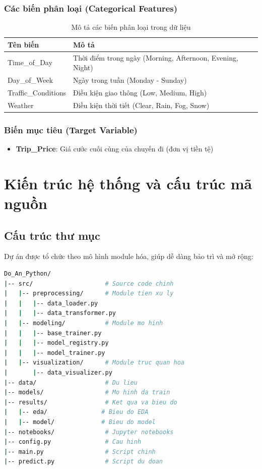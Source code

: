 \documentclass[12pt,a4paper]{article}
\begin{document}
\subsubsection{Các biến phân loại (Categorical Features)}

\begin{table}[H]
\centering
\caption{Mô tả các biến phân loại trong dữ liệu}
\label{tab:categorical_features}
\begin{tabular}{|l|p{8cm}|}
\hline
\textbf{Tên biến} & \textbf{Mô tả} \\
\hline
Time\_of\_Day & Thời điểm trong ngày (Morning, Afternoon, Evening, Night) \\
\hline
Day\_of\_Week & Ngày trong tuần (Monday - Sunday) \\
\hline
Traffic\_Conditions & Điều kiện giao thông (Low, Medium, High) \\
\hline
Weather & Điều kiện thời tiết (Clear, Rain, Fog, Snow) \\
\hline
\end{tabular}
\end{table}

\subsubsection{Biến mục tiêu (Target Variable)}

\begin{itemize}
    \item \textbf{Trip\_Price}: Giá cước cuối cùng của chuyến đi (đơn vị tiền tệ)
\end{itemize}

\section{Kiến trúc hệ thống và cấu trúc mã nguồn}

\subsection{Cấu trúc thư mục}

Dự án được tổ chức theo mô hình module hóa, giúp dễ dàng bảo trì và mở rộng:

\begin{lstlisting}[language=bash, caption={Cấu trúc thư mục dự án}]
Do_An_Python/
|-- src/                    # Source code chinh
|   |-- preprocessing/      # Module tien xu ly
|   |   |-- data_loader.py
|   |   |-- data_transformer.py
|   |-- modeling/           # Module mo hinh
|   |   |-- base_trainer.py
|   |   |-- model_registry.py
|   |   |-- model_trainer.py
|   |-- visualization/      # Module truc quan hoa
|       |-- data_visualizer.py
|-- data/                   # Du lieu
|-- models/                 # Mo hinh da train
|-- results/                # Ket qua va bieu do
|   |-- eda/               # Bieu do EDA
|   |-- model/             # Bieu do model
|-- notebooks/              # Jupyter notebooks
|-- config.py               # Cau hinh
|-- main.py                 # Script chinh
|-- predict.py              # Script du doan
\end{lstlisting}
\end{document}
